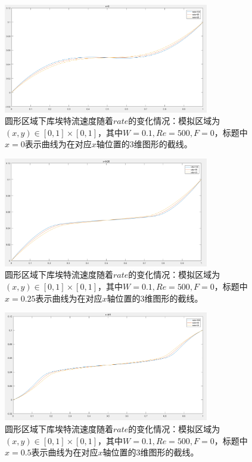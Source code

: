 \documentclass[11pt,UTF8]{ctexart}
\begin{document}
    \begin{figure}[h]
        \centerline{\includegraphics[width=0.8\textwidth]{Cu_rate_x=0.png}}
        \caption{圆形区域下库埃特流速度随着$rate$的变化情况：模拟区域为$(x,y)\in [0,1]\times [0,1]$，其中$W=0.1,Re=500,F=0$，标题中$x=0$表示曲线为在对应$x$轴位置的3维图形的截线。}
        \label{img14}
    \end{figure}
    \begin{figure}[h]
        \centerline{\includegraphics[width=0.8\textwidth]{Cu_rate_x=0_25.png}}
        \caption{圆形区域下库埃特流速度随着$rate$的变化情况：模拟区域为$(x,y)\in [0,1]\times [0,1]$，其中$W=0.1,Re=500,F=0$，标题中$x=0.25$表示曲线为在对应$x$轴位置的3维图形的截线。}
        \label{img15}
    \end{figure}
    \begin{figure}[h]
        \centerline{\includegraphics[width=0.8\textwidth]{Cu_rate_x=0_5.png}}
        \caption{圆形区域下库埃特流速度随着$rate$的变化情况：模拟区域为$(x,y)\in [0,1]\times [0,1]$，其中$W=0.1,Re=500,F=0$，标题中$x=0.5$表示曲线为在对应$x$轴位置的3维图形的截线。}
        \label{img16}
    \end{figure}
\end{document}
